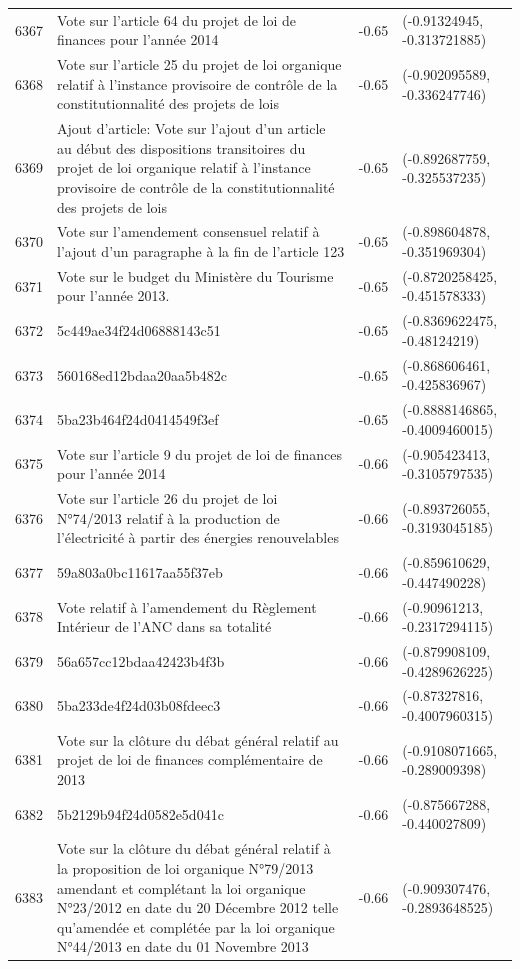 \begin{table}[ht]
\begin{tabular}{rlrl}
  6367 & Vote sur l'article 64 du projet de loi de finances pour l'année 2014 & -0.65 & (-0.91324945, -0.313721885) \\ 
  6368 & Vote sur l'article 25 du projet de loi organique relatif à l'instance provisoire de contrôle de la constitutionnalité des projets de lois & -0.65 & (-0.902095589, -0.336247746) \\ 
  6369 & Ajout d'article: Vote sur l'ajout d'un article au début des dispositions transitoires du projet de loi organique relatif à l'instance provisoire de contrôle de la constitutionnalité des projets de lois & -0.65 & (-0.892687759, -0.325537235) \\ 
  6370 & Vote sur l'amendement consensuel relatif à l'ajout d'un paragraphe à la fin de l'article 123 & -0.65 & (-0.898604878, -0.351969304) \\ 
  6371 & Vote sur le budget du Ministère du Tourisme pour l'année 2013. & -0.65 & (-0.8720258425, -0.451578333) \\ 
  6372 & 5c449ae34f24d06888143c51 & -0.65 & (-0.8369622475, -0.48124219) \\ 
  6373 & 560168ed12bdaa20aa5b482c & -0.65 & (-0.868606461, -0.425836967) \\ 
  6374 & 5ba23b464f24d0414549f3ef & -0.65 & (-0.8888146865, -0.4009460015) \\ 
  6375 & Vote sur l'article 9 du projet de loi de finances pour l'année 2014 & -0.66 & (-0.905423413, -0.3105797535) \\ 
  6376 & Vote sur l'article 26 du projet de loi N°74/2013 relatif à la production de l'électricité à partir des énergies renouvelables & -0.66 & (-0.893726055, -0.3193045185) \\ 
  6377 & 59a803a0bc11617aa55f37eb & -0.66 & (-0.859610629, -0.447490228) \\ 
  6378 & Vote relatif à l'amendement du Règlement Intérieur de l'ANC dans sa totalité & -0.66 & (-0.90961213, -0.2317294115) \\ 
  6379 & 56a657cc12bdaa42423b4f3b & -0.66 & (-0.879908109, -0.4289626225) \\ 
  6380 & 5ba233de4f24d03b08fdeec3 & -0.66 & (-0.87327816, -0.4007960315) \\ 
  6381 & Vote sur la clôture du débat général relatif au projet de loi de finances complémentaire de 2013 & -0.66 & (-0.9108071665, -0.289009398) \\ 
  6382 & 5b2129b94f24d0582e5d041c & -0.66 & (-0.875667288, -0.440027809) \\ 
  6383 & Vote sur la clôture du débat général relatif à la proposition de loi organique N°79/2013 amendant et complétant la loi organique N°23/2012 en date du 20 Décembre 2012 telle qu'amendée et complétée par la loi organique N°44/2013 en date du 01 Novembre 2013 & -0.66 & (-0.909307476, -0.2893648525) \\ 

\end{tabular}
\end{table}
